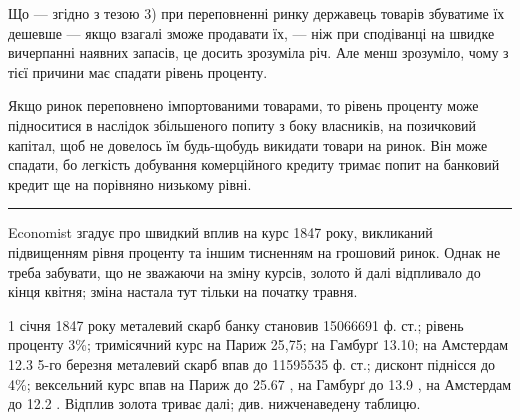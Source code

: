 
Що — згідно з тезою 3) при переповненні ринку державець товарів збуватиме
їх дешевше — якщо взагалі зможе продавати їх, — ніж при сподіванці на
швидке вичерпанні наявних запасів, це досить зрозуміла річ. Але менш зрозуміло,
чому з тієї причини має спадати рівень проценту.

Якщо ринок переповнено імпортованими товарами, то рівень проценту може
підноситися в наслідок збільшеного попиту з боку власників, на позичковий
капітал, щоб не довелось їм будь-щобудь викидати товари на ринок. Він може
спадати, бо легкість добування комерційного кредиту тримає попит на банковий
кредит ще на порівняно низькому рівні.

\pfbreak

Economist згадує про швидкий вплив на курс 1847 року, викликаний
підвищенням рівня проценту та іншим тисненням на грошовий ринок. Однак не
треба забувати, що не зважаючи на зміну курсів, золото й далі відпливало
до кінця квітня; зміна настала тут тільки на початку травня.

1 січня 1847 року металевий скарб банку становив 15066691 ф. ст.;
рівень проценту 3\%; тримісячний курс на Париж 25,75; на Гамбурґ 13.10;
на Амстердам 12.3  5-го березня металевий скарб впав до 11595535 ф. ст.;
дисконт піднісся до 4\%; вексельний курс впав на Париж до 25.67 , на Гамбурґ
до 13.9 , на Амстердам до 12.2 . Відплив золота триває далі; див.
нижченаведену таблицю.

